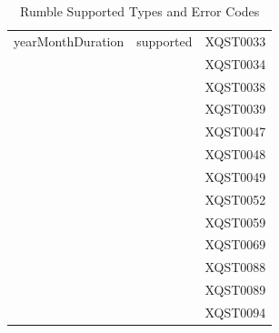 \begin{table}
\begin{tabular}{|l|l|r|}
		\cline{1-2}
		yearMonthDuration     & supported        & XQST0033                                              \\ 
		\cline{1-2}
		\multicolumn{1}{|l}{} &                  & XQST0034                                              \\
		\multicolumn{1}{|l}{} &                  & XQST0038                                              \\
		\multicolumn{1}{|l}{} &                  & XQST0039                                              \\
		\multicolumn{1}{|l}{} &                  & XQST0047                                              \\
		\multicolumn{1}{|l}{} &                  & XQST0048                                              \\
		\multicolumn{1}{|l}{} &                  & XQST0049                                              \\
		\multicolumn{1}{|l}{} &                  & XQST0052                                              \\
		\multicolumn{1}{|l}{} &                  & XQST0059                                              \\
		\multicolumn{1}{|l}{} &                  & XQST0069                                              \\
		\multicolumn{1}{|l}{} &                  & XQST0088                                              \\
		\multicolumn{1}{|l}{} &                  & XQST0089                                              \\
		\multicolumn{1}{|l}{} &                  & XQST0094                                              \\
		\hline
	\end{tabular}
	\caption{Rumble Supported Types and Error Codes}
	\label{tab:Phase2_Supported Types}
\end{table}

